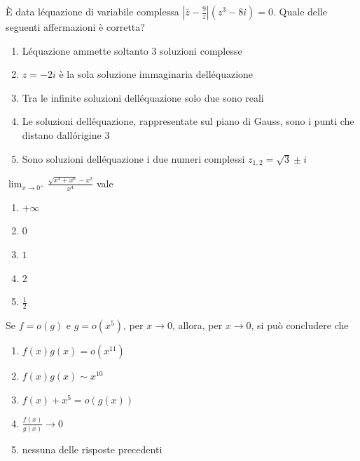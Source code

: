 \begin{quiz}
\`E data l\'equazione di variabile complessa $\left|\overline z-\frac9z\right|(z^3-8i)=0$. Quale delle seguenti affermazioni \`e corretta?
\begin{enumerate}
\item L\'equazione ammette soltanto $3$ soluzioni complesse
\item $z=-2i$ \`e la sola soluzione immaginaria dell\'equazione
\item Tra le infinite soluzioni dell\'equazione solo due sono reali
\item Le soluzioni dell\'equazione, rappresentate sul piano di Gauss, sono i punti che distano dall\'origine $3$
\item Sono soluzioni dell\'equazione i due numeri complessi $z_{1,2}=\sqrt3\pm i$
\end{enumerate}
\end{quiz}

\begin{quiz}
$\displaystyle\lim_{x\to0^+}\frac{\sqrt{x^4+x^6}-x^2}{x^4}$ vale
\begin{enumerate}
\item $+\infty$
\item $0$
\item $1$
\item $2$
\item $\frac12$
\end{enumerate}
\end{quiz}

\begin{quiz}
Se $f=o(g)$ e $g=o(x^5)$, per $x\to0$, allora, per $x\to0$, si pu\`o concludere che
\begin{enumerate}
\item $f(x)g(x)=o(x^{11})$
\item $f(x)g(x)\sim x^{10}$
\item $f(x)+x^5=o(g(x))$
\item $\frac{f(x)}{g(x)}\to0$
\item nessuna delle risposte precedenti
\end{enumerate}
\end{quiz}

